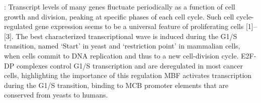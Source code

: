 \documentclass[]{article}
\begin{document}
\cite{aligianni2009fission}: Transcript levels of many genes fluctuate periodically as a function of cell growth and division, peaking at specific phases of each cell cycle. Such cell cycle-regulated gene expression seems to be a universal feature of proliferating cells [1]–[3]. The best characterized transcriptional wave is induced during the G1/S transition, named ‘Start’ in yeast and ‘restriction point’ in mammalian cells, when cells commit to DNA replication and thus to a new cell-division cycle. 
E2F-DP complexes control G1/S transcription and are deregulated in most cancer cells, highlighting the importance of this regulation
MBF activates transcription during the G1/S transition, binding to MCB promoter elements that are conserved from yeasts to humans.




\end{document}
